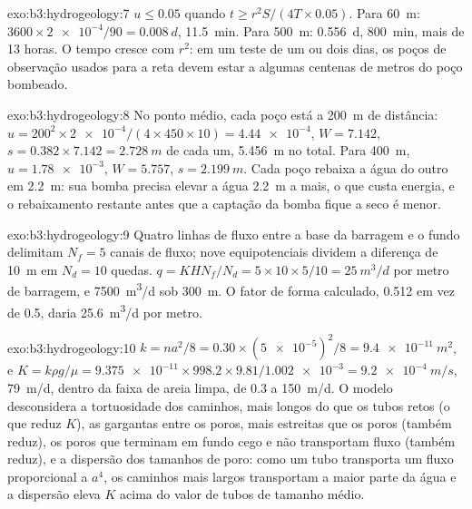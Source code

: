 \begin{solution}{exo:b3:hydrogeology:7}
$u \le 0.05$ quando $t \ge r^2S/(4T\times0.05)$. Para \qty{60}{m}: $3600\times
\num{2e-4}/90 = \qty{0.008}{d}$, \qty{11.5}{min}. Para \qty{500}{m}:
\qty{0.556}{d}, \qty{800}{min}, mais de 13 horas. O tempo cresce com $r^2$:
em um teste de um ou dois dias, os poços de observação usados para a reta
devem estar a algumas centenas de metros do poço bombeado.
\end{solution}

\begin{solution}{exo:b3:hydrogeology:8}
No ponto médio, cada poço está a \qty{200}{m} de distância: $u = 200^2\times\num{2e-4}/(4
\times450\times10) = \num{4.44e-4}$, $W = \num{7.142}$, $s = 0.382\times
7.142 = \qty{2.728}{m}$ de cada um, \qty{5.456}{m} no total. Para
\qty{400}{m}, $u = \num{1.78e-3}$, $W = \num{5.757}$, $s =
\qty{2.199}{m}$. Cada poço rebaixa a água do outro em
\qty{2.2}{m}: sua bomba precisa elevar a água \qty{2.2}{m} a mais, o que
custa energia, e o rebaixamento restante antes que a captação da bomba fique a seco é
menor.
\end{solution}

\begin{solution}{exo:b3:hydrogeology:9}
Quatro linhas de fluxo entre a base da barragem e o fundo delimitam $N_f = 5$
canais de fluxo; nove equipotenciais dividem a diferença de \qty{10}{m} em $N_d = 10$
quedas. $q = KHN_f/N_d = 5\times10\times5/10 = \qty{25}{m^3/d}$ por metro
de barragem, e \qty{7500}{m^3/d} sob \qty{300}{m}. O fator de
forma calculado, 0.512 em vez de 0.5, daria \qty{25.6}{m^3/d} por metro.
\end{solution}

\begin{solution}{exo:b3:hydrogeology:10}
$k = na^2/8 = 0.30\times(\num{5e-5})^2/8 = \qty{9.4e-11}{m^2}$, e $K =
k\rho g/\mu = \num{9.375e-11}\times998.2\times9.81/\num{1.002e-3} =
\qty{9.2e-4}{m/s}$, \qty{79}{m/d}, dentro da faixa de areia limpa, de 0.3 a
\qty{150}{m/d}. O modelo desconsidera a tortuosidade dos caminhos, mais longos
do que os tubos retos (o que reduz $K$), as gargantas entre os poros,
mais estreitas que os poros (também reduz), os poros que terminam em fundo cego e não transportam
fluxo (também reduz), e a dispersão dos tamanhos de poro: como um tubo transporta um
fluxo proporcional a $a^4$, os caminhos mais largos transportam a maior parte da água e
a dispersão eleva $K$ acima do valor de tubos de tamanho médio.
\end{solution}

